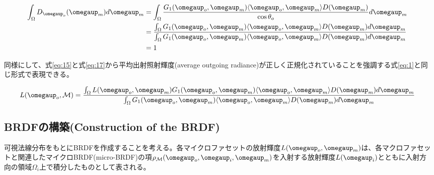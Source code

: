 \documentclass[a4j,xelatex,ja=standard]{bxjsarticle}
\begin{document}
\begin{equation}
    \begin{split}
        \int_\Omega D_{\boldsymbol{\omegaup}_o}(\boldsymbol{\omegaup}_m) d\boldsymbol{\omegaup}_m
        &= \int_\Omega \frac{G_1(\boldsymbol{\omegaup}_o, \boldsymbol{\omegaup}_m) \langle \boldsymbol{\omegaup}_o, \boldsymbol{\omegaup}_m \rangle D(\boldsymbol{\omegaup}_m)}{\cos\theta_o} d\boldsymbol{\omegaup}_m \\
        &= \frac{\int_\Omega G_1(\boldsymbol{\omegaup}_o, \boldsymbol{\omegaup}_m) \langle \boldsymbol{\omegaup}_o, \boldsymbol{\omegaup}_m \rangle D(\boldsymbol{\omegaup}_m) d\boldsymbol{\omegaup}_m}{\int_\Omega G_1(\boldsymbol{\omegaup}_o, \boldsymbol{\omegaup}_m) \langle \boldsymbol{\omegaup}_o, \boldsymbol{\omegaup}_m \rangle D(\boldsymbol{\omegaup}_m)d \boldsymbol{\omegaup}_m} \\
        &= 1
    \end{split}
    \label{eq:18}
\end{equation}

同様にして、式\eqref{eq:15}と式\eqref{eq:17}から平均出射照射輝度(average outgoing radiance)が正しく正規化されていることを強調する式\eqref{eq:1}と同じ形式で表現できる。

\begin{equation}
    L(\boldsymbol{\omegaup}_o, \mathcal{M}) = \frac{\int_\Omega L(\boldsymbol{\omegaup}_o, \boldsymbol{\omegaup}_m) G_1(\boldsymbol{\omegaup}_o, \boldsymbol{\omegaup}_m) \langle \boldsymbol{\omegaup}_o, \boldsymbol{\omegaup}_m \rangle D(\boldsymbol{\omegaup}_m) d \boldsymbol{\omegaup}_m}{\int_\Omega G_1(\boldsymbol{\omegaup}_o, \boldsymbol{\omegaup}_m) \langle \boldsymbol{\omegaup}_o, \boldsymbol{\omegaup}_m \rangle D(\boldsymbol{\omegaup}_m)d \boldsymbol{\omegaup}_m}
    \label{eq:19}
\end{equation}

\subsection{BRDFの構築(Construction of the BRDF)}
\label{sec:3.2}

可視法線分布をもとにBRDFを作成することを考える。各マイクロファセットの放射輝度$L(\boldsymbol{\omegaup}_o, \boldsymbol{\omegaup}_m)$は、各マクロファセットと関連したマイクロBRDF(micro-BRDF)の項$\rho_{\mathcal M}(\boldsymbol{\omegaup}_o, \boldsymbol{\omegaup}_i, \boldsymbol{\omegaup}_m)$を入射する放射輝度$L(\boldsymbol{\omegaup}_i)$とともに入射方向の領域$\Omega_i$上で積分したものとして表される。
\end{document}
